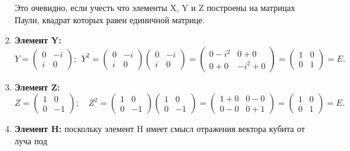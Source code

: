 \documentclass[pscyr,notitlepage]{hedwork}
\renewcommand{\~}[1]{\widetilde{#1}}
\begin{document}
\begin{enumerate}
      Это очевидно, если учесть что элементы X, Y и Z построены на матрицах
      Паули, квадрат которых равен единичной матрице.
    \item \textbf{Элемент Y:}
      \[
        Y =
        \begin{pmatrix}
          0 & -i \\[-1.7ex] i & 0
        \end{pmatrix}\!\!;
        \ \
        Y^2 = \!
        \begin{pmatrix}
          0 & -i \\[-1.7ex] i & 0
        \end{pmatrix}\!\!
        \begin{pmatrix}
          0 & -i \\[-1.7ex] i & 0
        \end{pmatrix} \!=\!
        \begin{pmatrix}
          0 - i^2 & 0 + 0 \\[-1.7ex] 0 + 0 & -i^2 + 0
        \end{pmatrix} \!=\!
        \begin{pmatrix}
          1 & 0 \\[-1.7ex] 0 & 1
        \end{pmatrix} = E.
      \]
    \item \textbf{Элемент Z:}
      \[
        Z =
        \begin{pmatrix}
          1 & 0 \\[-1.7ex] 0 & -1
        \end{pmatrix}\!\!;
        \quad
        Z^2 =
        \begin{pmatrix}
          1 & 0 \\[-1.7ex] 0 & -1
        \end{pmatrix}
        \begin{pmatrix}
          1 & 0 \\[-1.7ex] 0 & -1
        \end{pmatrix} =
        \begin{pmatrix}
          1 + 0 & 0 - 0 \\[-1.7ex] 0 - 0 & 0 + 1
        \end{pmatrix} =
        \begin{pmatrix}
          1 & 0 \\[-1.7ex] 0 & 1
        \end{pmatrix} = E.
      \]
    \item \textbf{Элемент H:}
      поскольку элемент H имеет смысл отражения вектора кубита от луча под

\end{enumerate}
\end{document}
